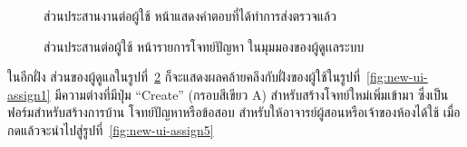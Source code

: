 \documentclass[12pt,one side,openright,a4paper]{cpe-thesis-th}
\newcommand{\thaijustify}[1]{%
  \par\hspace{30pt}\justifying
  #1
}
\begin{document}
\begin{figure}[H]
  \centering
  \caption[ส่วนประสานต่อผู้ใช้ หน้าแผงเขียนโปรแกรม (กดแสดงคำตอบที่ได้ทำการส่งตรวจแล้ว)]{ส่วนประสานงานต่อผู้ใช้ หน้าแสดงคำตอบที่ได้ทำการส่งตรวจแล้ว}
  \label{fig:new-ui-code3}
\end{figure}
\begin{figure}[H]
  \centering
  \caption[ส่วนประสานต่อผู้ใช้ หน้ารายการโจทย์ปัญหาของผู้ดูเเลระบบ]{ส่วนประสานต่อผู้ใช้ หน้ารายการโจทย์ปัญหา ในมุมมองของผู้ดูเเลระบบ}
  \label{fig:new-ui-assign2}
\end{figure}
\thaijustify{
  ในอีกฝั่ง ส่วนของผู้ดูแลในรูปที่~\ref{fig:new-ui-assign2} ก็จะแสดงผลคล้ายคลึงกับฝั่งของผู้ใช้ในรูปที่~\ref{fig:new-ui-assign1} มีความต่างที่มีปุ่ม “Create” (กรอบสีเขียว A) สำหรับสร้างโจทย์ใหม่เพิ่มเข้ามา ซึ่งเป็นฟอร์มสำหรับสร้างการบ้าน โจทย์ปัญหาหรือข้อสอบ สำหรับให้อาจารย์ผู้สอนหรือเจ้าของห้องได้ใช้ เมื่อกดแล้วจะนำไปสู่รูปที่~\ref{fig:new-ui-assign5}
}
\end{document}
